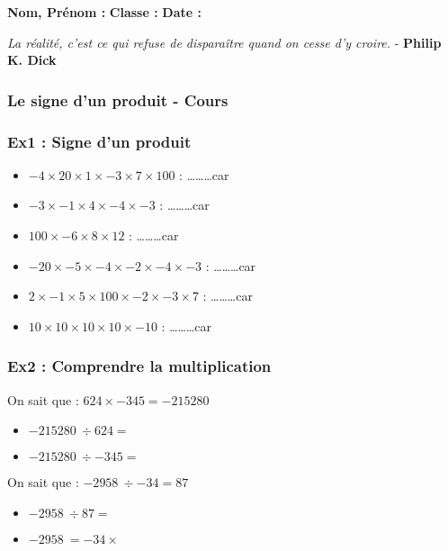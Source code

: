 



\textbf{Nom, Prénom :} \hspace{8cm} \textbf{Classe :} \hspace{3cm} \textbf{Date :}\\

\begin{center}
  \textit{La réalité, c'est ce qui refuse de disparaître quand on cesse d'y croire.}  - \textbf{Philip K. Dick}
\end{center}

\subsubsection*{Le signe d'un produit - Cours}

\Pointilles[5]

\subsubsection*{Ex1 : Signe d'un produit}

\begin{itemize}[label={$\bullet$}]
  \item $- 4 \times 20 \times 1 \times -3 \times 7 \times 100 $ : \ldots\ldots\ldots car \dotfill
  \item $-3 \times -1 \times 4 \times -4 \times -3 $ : \ldots\ldots\ldots car \dotfill
  \item $100 \times -6 \times 8 \times 12 $  : \ldots\ldots\ldots car \dotfill 
  \item $-20 \times -5 \times -4 \times -2 \times -4 \times -3$ : \ldots\ldots\ldots car \dotfill
  \item $2 \times -1 \times 5 \times 100 \times -2 \times -3 \times 7$ : \ldots\ldots\ldots car \dotfill
  \item $10 \times 10 \times 10 \times 10 \times -10 $  : \ldots\ldots\ldots car \dotfill
\end{itemize}

\subsubsection*{Ex2 : Comprendre la multiplication}

\begin{multicols}{2}

On sait que : $624 \times -345 = \SI{-215 280}{}$
\begin{itemize}[label={$\bullet$}]
  \item $\SI{-215 280}{} \div 624 =$ \dotfill
  \item $\SI{-215 280}{} \div -345 = $ \dotfill
\end{itemize}

On sait que : $\SI{-2 958}{} \div -34 = 87$
\begin{itemize}[label={$\bullet$}]
  \item $\SI{-2 958}{} \div 87 =$ \dotfill
  \item $\SI{-2 958}{} = -34 \times $ \dotfill
\end{itemize}

\end{multicols}

